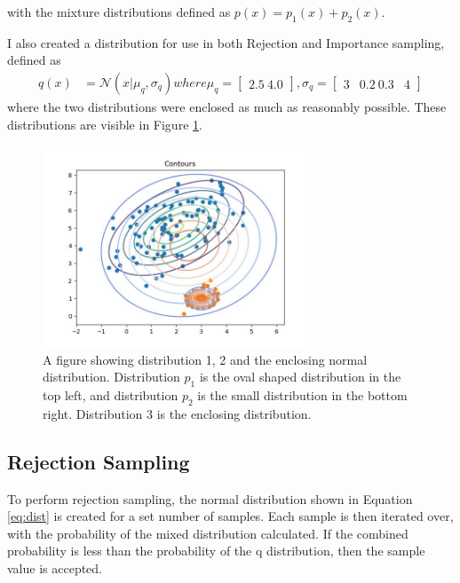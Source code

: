 \documentclass[a4paper, 11pt]{article}
\begin{document}
with the mixture distributions defined as $ p(x) = p_1(x) + p_2(x)$. 

I also created a distribution for use in both Rejection and Importance sampling, defined as 
\begin{equation}\label{eq:dist}
    \begin{align*}
        q(x) &= \mathcal{N}(x|\mu_q, \sigma_q) where \mu_q = \begin{bmatrix}2.5 \ 4.0\end{bmatrix}, \sigma_q = \begin{bmatrix}3 & 0.2 \ 0.3 & 4\end{bmatrix}
    \end{align*}
\end{equation}
where the two distributions were enclosed as much as reasonably possible. These distributions are visible in Figure \ref*{fig:distributions}.

\begin{figure}[h]
    \includegraphics[width=8cm]{fig/distributionsplotted.jpg}
    \caption{A figure showing distribution 1, 2 and the enclosing normal distribution. Distribution $p_1$ is the oval shaped distribution in the top left, and distribution $p_2$ is the small distribution in the bottom right. Distribution 3 is the enclosing distribution.}
    \label{fig:distributions}
\end{figure}

\subsection{Rejection Sampling}

To perform rejection sampling, the normal distribution shown in Equation \ref{eq:dist} is created for a set number of samples. Each sample is then iterated over, with the probability of the mixed distribution calculated. If the combined probability is less than the probability of the q distribution, then the sample value is accepted.
\end{document}
